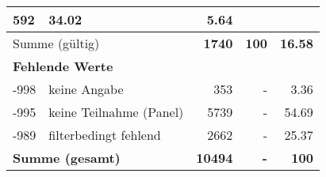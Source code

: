 \begin{longtable}{lXrrr}
       \num{592} &
       \num[round-mode=places,round-precision=2]{34,02} &
         \num[round-mode=places,round-precision=2]{5,64} \\
     \midrule
     \multicolumn{2}{l}{Summe (gültig)} &
       \textbf{\num{1740}} &
     \textbf{100} &
       \textbf{\num[round-mode=places,round-precision=2]{16,58}} \\
     \multicolumn{5}{l}{\textbf{Fehlende Werte}}\\
       -998 &
       keine Angabe &
         \num{353} &
        - &
         \num[round-mode=places,round-precision=2]{3,36} \\
       -995 &
       keine Teilnahme (Panel) &
         \num{5739} &
        - &
         \num[round-mode=places,round-precision=2]{54,69} \\
       -989 &
       filterbedingt fehlend &
         \num{2662} &
        - &
         \num[round-mode=places,round-precision=2]{25,37} \\
     \midrule
     \multicolumn{2}{l}{\textbf{Summe (gesamt)}} &
          \textbf{\num{10494}} &
        \textbf{-} &
        \textbf{100} \\
     \bottomrule
     \end{longtable}
     
